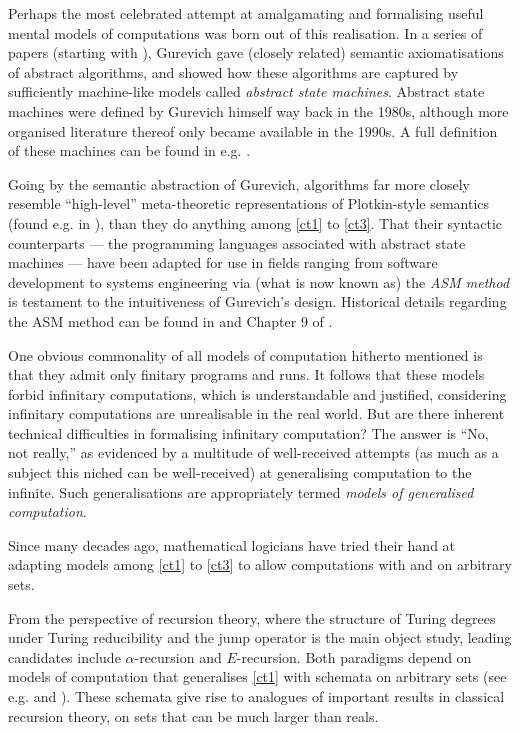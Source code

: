 \documentclass[12pt, twoside]{memoir}
\numberwithin{equation}{section}
\theoremstyle{definition}
\theoremstyle{remark}
\theoremstyle{definition}
\theoremstyle{definition}
\theoremstyle{definition}
\theoremstyle{remark}
\begin{document}
Perhaps the most celebrated attempt at amalgamating and formalising useful mental models of computations was born out of this realisation. In a series of papers (starting with \cite{gurevich}), Gurevich gave (closely related) semantic axiomatisations of abstract algorithms, and showed how these algorithms are captured by sufficiently machine-like models called \textit{abstract state machines}. Abstract state machines were defined by Gurevich himself way back in the 1980s, although more organised literature thereof only became available in the 1990s. A full definition of these machines can be found in e.g. \cite{evolvingalg}.

Going by the semantic abstraction of Gurevich, algorithms far more closely resemble ``high-level'' meta-theoretic representations of Plotkin-style semantics (found e.g. in \cite{plotkin}), than they do anything among \ref{ct1} to \ref{ct3}. That their syntactic counterparts --- the programming languages associated with abstract state machines --- have been adapted for use in fields ranging from software development to systems engineering via (what is now known as) the \textit{ASM method} is testament to the intuitiveness of Gurevich's design. Historical details regarding the ASM method can be found in \cite{borger} and Chapter 9 of \cite{borgerbook}.

One obvious commonality of all models of computation hitherto mentioned is that they admit only finitary programs and runs. It follows that these models forbid infinitary computations, which is understandable and justified, considering infinitary computations are unrealisable in the real world. But are there inherent technical difficulties in formalising infinitary computation? The answer is ``No, not really,'' as evidenced by a multitude of well-received attempts (as much as a subject this niched can be well-received) at generalising computation to the infinite. Such generalisations are appropriately termed \textit{models of generalised computation}.

Since many decades ago, mathematical logicians have tried their hand at adapting models among \ref{ct1} to \ref{ct3} to allow computations with and on arbitrary sets.

From the perspective of recursion theory, where the structure of Turing degrees under Turing reducibility and the jump operator is the main object study, leading candidates include $\alpha$-recursion and $E$-recursion. Both paradigms depend on models of computation that generalises \ref{ct1} with schemata on arbitrary sets (see e.g. \cite{takeuti} and \cite{normann}). These schemata give rise to analogues of important results in classical recursion theory, on sets that can be much larger than reals. 
\end{document}
